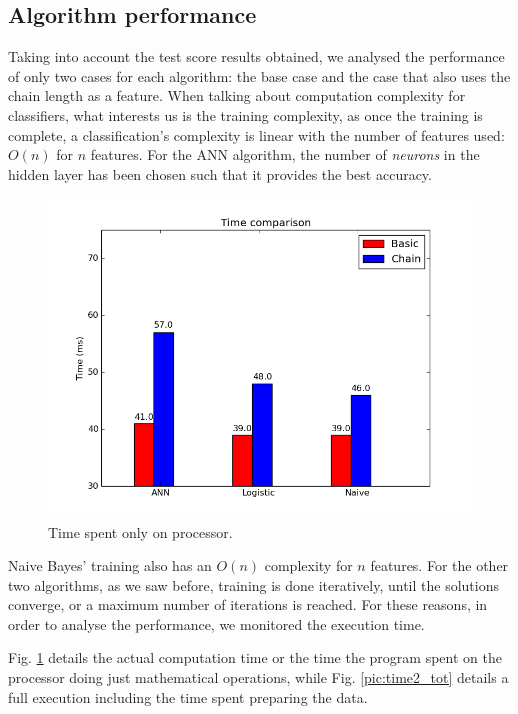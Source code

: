 \subsection{Algorithm performance}

Taking into account the test score results obtained, we analysed the performance of only two cases for each algorithm: the base case and the case that also uses the chain length as a feature. When talking about computation complexity for classifiers, what interests us is the training complexity, as once the training is complete, a classification's complexity is linear with the number of features used: $O(n)$ for $n$ features. For the ANN algorithm, the number of \textit{neurons} in the hidden layer has been chosen such that it provides the best accuracy. 

\begin{figure}[h]
	\begin{center}
		\includegraphics[scale=0.6]{figures/time1_tot.png}
	\end{center}
	
	\caption{Time spent only on processor.}
	\label{pic:time1_tot}

\end{figure}

Naive Bayes' training also has an $O(n)$ complexity for $n$ features. For the other two algorithms, as we saw before, training is done iteratively, until the solutions converge, or a maximum number of iterations is reached. For these reasons, in order to analyse the performance, we monitored the execution time.

Fig. \ref{pic:time1_tot} details the actual computation time or the time the program spent on the processor doing just mathematical operations, while Fig. \ref{pic:time2_tot} details a full execution including the time spent preparing the data. 

